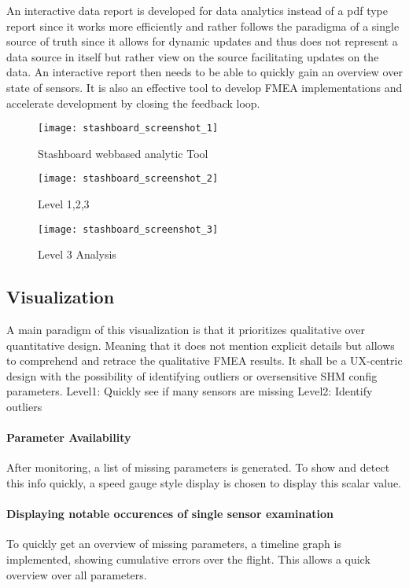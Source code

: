An interactive data report is developed for data analytics instead of a pdf type report since it works more efficiently and rather follows the paradigma of a single source of truth since it allows for dynamic updates and thus does not represent a data source in itself but rather view on the source facilitating updates on the data.
An interactive report then needs to be able to quickly gain an overview over state of sensors. It is also an effective tool to develop FMEA implementations and accelerate development by closing the feedback loop.



\begin{figure}
    \centering
    \texttt{[image: stashboard\_screenshot\_1]}
    \caption{Stashboard webbased analytic Tool }
    \label{fig:stashboard_1}
\end{figure}
\begin{figure}
    \centering
    \texttt{[image: stashboard\_screenshot\_2]}
    \caption{Level 1,2,3}
    \label{fig:stashboard_2}
\end{figure}
\begin{figure}
    \centering
    \texttt{[image: stashboard\_screenshot\_3]}
    \caption{Level 3 Analysis}
    \label{fig:stashboard_3}
\end{figure}

\subsection{Visualization}
A main paradigm of this visualization is that it prioritizes qualitative over quantitative design. Meaning that it does not mention explicit details but allows to comprehend and retrace the qualitative FMEA results. It shall be a UX-centric design with the possibility of identifying outliers or oversensitive SHM config parameters. Level1: Quickly see if many sensors are missing Level2: Identify outliers

\paragraph{Parameter Availability}
After monitoring, a list of missing parameters is generated. To show and detect this info quickly, a speed gauge style display is chosen to display this scalar value.

\paragraph{Displaying notable occurences of single sensor examination}
To quickly get an overview of missing parameters, a timeline graph is implemented, showing cumulative errors over the flight. This allows a quick overview over all parameters.


